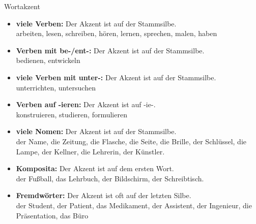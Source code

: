 \begin{phonetics}{Wortakzent}{}
\begin{itemize}
	\item \textbf{viele Verben:} Der Akzent ist auf der Stammsilbe. \\
		arbeiten, lesen, schreiben, hören, lernen, sprechen, malen, haben
	\item \textbf{Verben mit be-/ent-:} Der Akzent ist auf der Stammsilbe. \\
		bedienen, entwickeln
	\item \textbf{viele Verben mit unter-:} Der Akzent ist auf der Stammsilbe. \\
		unterrichten, untersuchen
	\item \textbf{Verben auf -ieren:} Der Akzent ist auf -ie-. \\
		konstruieren, studieren, formulieren
\end{itemize}
\begin{itemize}
	\item \textbf{viele Nomen:} Der Akzent ist auf der Stammsilbe. \\
		der Name, die Zeitung, die Flasche, die Seite, die Brille, der Schlüssel, die Lampe, der Kellner, die Lehrerin, der Künstler.
	\item \textbf{Komposita:} Der Akzent ist auf dem ersten Wort. \\
		der Fußball, das Lehrbuch, der Bildschirm, der Schreibtisch.
	\item \textbf{Fremdwörter:} Der Akzent ist oft auf der letzten Silbe. \\
		der Student, der Patient, das Medikament, der Assistent, der Ingenieur, die Präsentation, das Büro
\end{itemize}
\end{phonetics}
